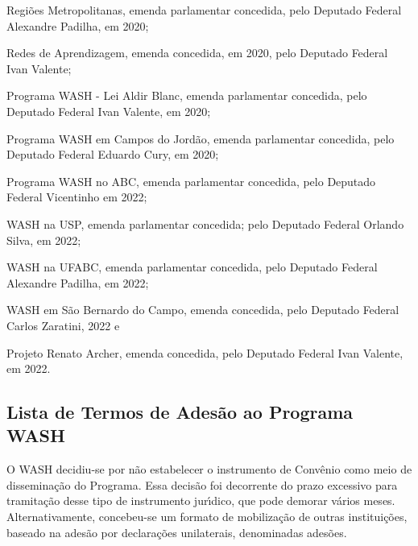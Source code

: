 \documentclass[
12pt,		%
openright,	%
twoside,  %
a4paper,			%
chapter=TITLE,		%
english,			%
french,				%
spanish,			%
brazil				%
]{USPSC-classe/USPSC}
\begin{document}
\begin{alineas}
\item \textquotedbl Regi\~oes Metropolitanas\textquotedbl , emenda parlamentar concedida, pelo Deputado Federal Alexandre Padilha, em 2020;
\item \textquotedbl Redes de Aprendizagem\textquotedbl , emenda concedida, em 2020, pelo Deputado Federal Ivan Valente;
\item \textquotedbl Programa WASH - Lei Aldir Blanc\textquotedbl , emenda parlamentar concedida, pelo Deputado Federal  Ivan Valente, em 2020;
\item \textquotedbl Programa WASH em Campos do Jord\~ao\textquotedbl , emenda parlamentar concedida, pelo Deputado Federal Eduardo Cury, em 2020;
\item \textquotedbl Programa WASH no ABC\textquotedbl , emenda parlamentar concedida, pelo Deputado Federal Vicentinho em 2022;
\item \textquotedbl WASH na USP\textquotedbl , emenda parlamentar concedida; pelo Deputado Federal Orlando Silva, em 2022;
\item \textquotedbl WASH na UFABC\textquotedbl , emenda parlamentar concedida, pelo Deputado Federal Alexandre Padilha, em 2022;
\item \textquotedbl WASH em S\~ao Bernardo do Campo\textquotedbl , emenda concedida, pelo Deputado Federal Carlos Zaratini, 2022 e
\item \textquotedbl Projeto Renato Archer\textquotedbl , emenda concedida, pelo Deputado Federal Ivan Valente, em 2022.
\end{alineas}

\subsection[Lista de Termos de Ades\~ao ao Programa WASH]{Lista de Termos de Ades\~ao ao Programa WASH}\label{Lista de Termos de Ades\~ao ao Programa WASH}
O WASH decidiu-se por n\~ao estabelecer o instrumento de Conv\^enio como meio de dissemina\c{c}\~ao do Programa. Essa decis\~ao foi decorrente do prazo excessivo para tramita\c{c}\~ao desse tipo de instrumento jur\'{\i}dico, que pode demorar v\'arios meses. Alternativamente, concebeu-se um formato de mobiliza\c{c}\~ao de outras institui\c{c}\~oes, baseado na ades\~ao por declara\c{c}\~oes  unilaterais, denominadas \textquotedbl ades\~oes\textquotedbl .
\end{document}
